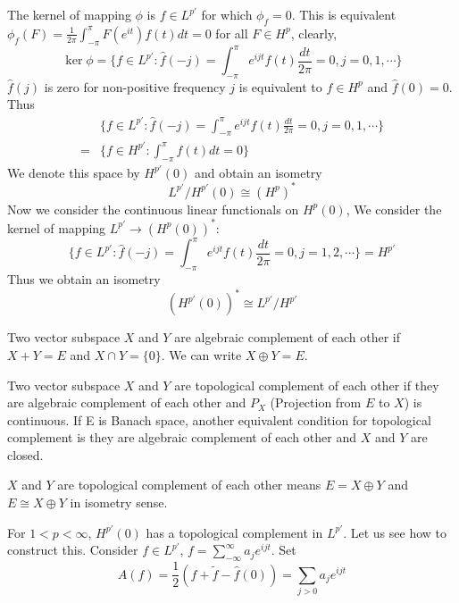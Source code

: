 The kernel of mapping $\phi$ is $f\in  L^{p'}$ for which $\phi_f=0$. This is equivalent $\phi_f(F)=\frac{1}{2\pi}\int_{-\pi}^{\pi}{F(e^{it})f(t)d t}=0$ for all $F\in H^p$, clearly,
\begin{equation*}
    \ker{\phi}=\{f\in L^{p'}: \hat{f}(-j)=\int_{-\pi}^{\pi}{e^{i j t}f(t)\frac{dt}{2\pi}}=0, j=0,1,\cdots\}
\end{equation*}
$\hat{f}(j)$ is zero for non-positive frequency $j$ is equivalent to $f\in H^p$ and $\hat{f}(0)=0$. Thus
\begin{align*}
      & \{f\in L^{p'}: \hat{f}(-j)=\int_{-\pi}^{\pi}{e^{i j t}f(t)\frac{dt}{2\pi}}=0, j=0,1,\cdots\} \\
    = & \{f\in H^{p'}: \int_{-\pi}^{\pi}{f(t)d t}=0\}
\end{align*}
We denote this space by $H^{p'}(0)$ and obtain an isometry 
\begin{equation}\label{dual of Hp}
    L^{p'}/ H^{p'}(0)\cong (H^p)^*
\end{equation}
Now we consider the continuous linear functionals on $H^{p}(0)$, We consider the kernel of mapping $L^{p'}\to (H^{p}(0))^*$:
\begin{equation*}
    \{f\in L^{p'}: \hat{f}(-j)=\int_{-\pi}^{\pi}{e^{i j t}f(t)\frac{dt}{2\pi}}=0, j=1,2,\cdots\}=H^{p'}
\end{equation*}
Thus we obtain an isometry 
\begin{equation}\label{dual of Hp(0)}
    (H^{p'}(0))^*\cong L^{p'}/ H^{p'}
\end{equation}
\begin{remark}
Two vector subspace $X$ and $Y$ are algebraic complement of each other if $X+Y=E$ and $X\cap Y=\{0\}$. We can write $X\oplus Y=E$.\par
Two vector subspace $X$ and $Y$ are topological complement of each other if they are algebraic complement of each other and $P_X$ (Projection from $E$ to $X$) is continuous. If E is 
Banach space, another equivalent condition for topological complement is they are algebraic complement of each other and  $X$ and $Y$ are closed.\par
$X$ and $Y$ are topological complement of each other means $E=X\oplus Y$ and $E\cong X\oplus Y$ in isometry sense.
\end{remark}
For $1<p<\infty$, $H^{p'}(0)$ has a topological complement in $L^{p'}$. Let us see how to construct this. Consider $f\in L^{p'}$, $f=\sum_{-\infty}^{\infty}{a_je^{ijt}}$. Set
\begin{equation*}
    A(f)=\frac{1}{2}(f+\tilde{f}-\hat{f}(0))=\sum_{j>0}{a_je^{i j t}}
\end{equation*}
